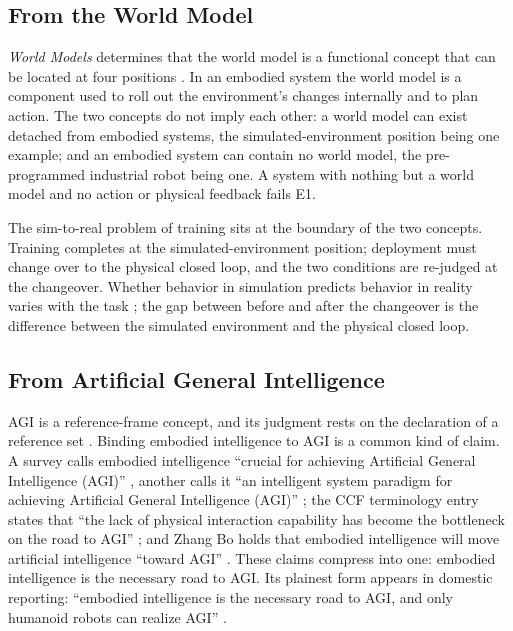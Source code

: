 \documentclass[10pt]{article}
\begin{document}
\subsection{From the World Model}\label{sec:worldmodels}

\textit{World Models} determines that the world model is a functional concept that can be located at four positions \cite{yu2026wm}. In an embodied system the world model is a component used to roll out the environment's changes internally and to plan action. The two concepts do not imply each other: a world model can exist detached from embodied systems, the simulated-environment position being one example; and an embodied system can contain no world model, the pre-programmed industrial robot being one. A system with nothing but a world model and no action or physical feedback fails E1.

The sim-to-real problem of training sits at the boundary of the two concepts. Training completes at the simulated-environment position; deployment must change over to the physical closed loop, and the two conditions are re-judged at the changeover. Whether behavior in simulation predicts behavior in reality varies with the task \cite{kadian2020,chebotar2019}; the gap between before and after the changeover is the difference between the simulated environment and the physical closed loop.

\subsection{From Artificial General Intelligence}\label{sec:fromagi}

AGI is a reference-frame concept, and its judgment rests on the declaration of a reference set \cite{yu2026four}. Binding embodied intelligence to AGI is a common kind of claim. A survey calls embodied intelligence ``crucial for achieving Artificial General Intelligence (AGI)'' \cite{liu2024survey}, another calls it ``an intelligent system paradigm for achieving Artificial General Intelligence (AGI)'' \cite{feng2025}; the CCF terminology entry states that ``the lack of physical interaction capability has become the bottleneck on the road to AGI'' \cite{ccf2023}; and Zhang Bo holds that embodied intelligence will move artificial intelligence ``toward AGI'' \cite{zhangbo2025}. These claims compress into one: embodied intelligence is the necessary road to AGI. Its plainest form appears in domestic reporting: ``embodied intelligence is the necessary road to AGI, and only humanoid robots can realize AGI'' \cite{jiemian2024}.
\end{document}
